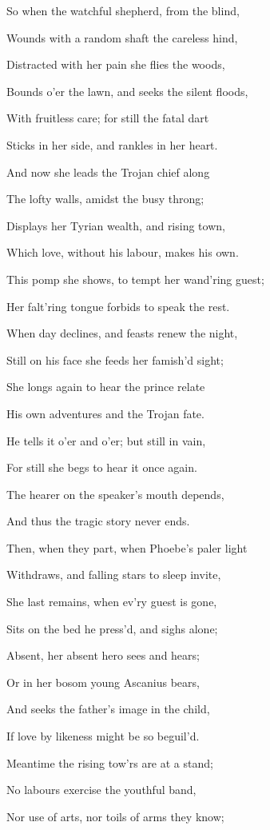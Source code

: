 So when the watchful shepherd, from the blind,

Wounds with a random shaft the careless hind,

Distracted with her pain she flies the woods,

Bounds o’er the lawn, and seeks the silent floods,

With fruitless care; for still the fatal dart

Sticks in her side, and rankles in her heart.

And now she leads the Trojan chief along

The lofty walls, amidst the busy throng;

Displays her Tyrian wealth, and rising town,

Which love, without his labour, makes his own.

This pomp she shows, to tempt her wand’ring guest;

Her falt’ring tongue forbids to speak the rest.

When day declines, and feasts renew the night,

Still on his face she feeds her famish’d sight;

She longs again to hear the prince relate

His own adventures and the Trojan fate.

He tells it o’er and o’er; but still in vain,

For still she begs to hear it once again.

The hearer on the speaker’s mouth depends,

And thus the tragic story never ends.

Then, when they part, when Phoebe’s paler light

Withdraws, and falling stars to sleep invite,

She last remains, when ev’ry guest is gone,

Sits on the bed he press’d, and sighs alone;

Absent, her absent hero sees and hears;

Or in her bosom young Ascanius bears,

And seeks the father’s image in the child,

If love by likeness might be so beguil’d.

Meantime the rising tow’rs are at a stand;

No labours exercise the youthful band,

Nor use of arts, nor toils of arms they know;


